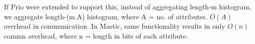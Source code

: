 If Prio were extended to support this, instead of aggregating length-m histogram, we aggregate length-(m.A) histogram, where A = no. of attributes. $O(A)$ overhead in communication. In Mastic, same functionality results in only $O(n)$ commn overhead, where n = length in bits of each attribute.



%
